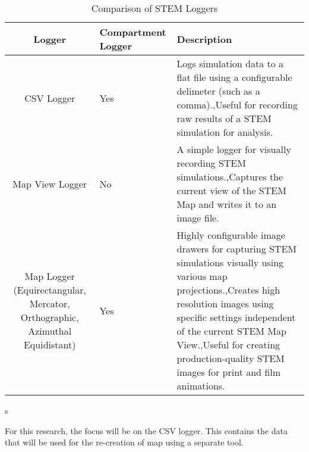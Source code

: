 \begin{table}[!htbp]
\centering
\caption{Comparison of STEM Loggers}
\label{Table:StemLogger}
\begin{tabular}{SML}
\hline
\textbf{Logger}                                                             & \textbf{Compartment Logger} & Description                                                                                                                                                                                                                                                                                 \\ \hline
CSV Logger                                                                  & Yes                         & Logs simulation data to a flat file using a configurable delimeter (such as a comma).,Useful for recording raw results of a STEM simulation for analysis.                                                                                                                                   \\
Map View Logger                                                             & No                          & A simple logger for visually recording STEM simulations.,Captures the current view of the STEM Map and writes it to an image file.                                                                                                                                                          \\
Map Logger (Equirectangular, Mercator, Orthographic, Azimuthal Equidistant) & Yes                         & Highly configurable image drawers for capturing STEM simulations visually using various map projections.,Creates high resolution images using specific settings independent of the current STEM Map View.,Useful for creating production-quality STEM images for print and film animations. \\
\end{tabular}s
\end{table}


For this research, the focus will be on the CSV logger. This contains the data that will be used for the re-creation of map using a separate tool. 


